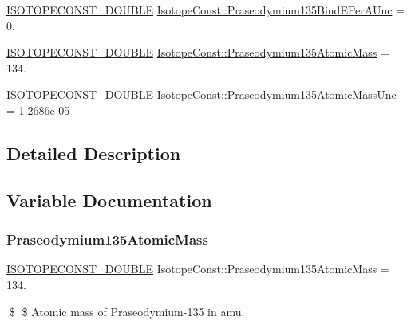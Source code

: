 \begin{DoxyCompactItemize}
\item 
\mbox{\hyperlink{group___isotope_const-_macros_ga8f45a7272ce02c0b4c65c44636ed719a}{I\+S\+O\+T\+O\+P\+E\+C\+O\+N\+S\+T\+\_\+\+D\+O\+U\+B\+LE}} \mbox{\hyperlink{group___isotope_const-_praseodymium-_pr135_gaa2e32c6ea644a5f626e7613ca90091ff}{Isotope\+Const\+::\+Praseodymium135\+Bind\+E\+Per\+A\+Unc}} = 0.
\item 
\mbox{\hyperlink{group___isotope_const-_macros_ga8f45a7272ce02c0b4c65c44636ed719a}{I\+S\+O\+T\+O\+P\+E\+C\+O\+N\+S\+T\+\_\+\+D\+O\+U\+B\+LE}} \mbox{\hyperlink{group___isotope_const-_praseodymium-_pr135_ga6e013e1e318a009cbfbd9b485cb2baae}{Isotope\+Const\+::\+Praseodymium135\+Atomic\+Mass}} = 134.
\item 
\mbox{\hyperlink{group___isotope_const-_macros_ga8f45a7272ce02c0b4c65c44636ed719a}{I\+S\+O\+T\+O\+P\+E\+C\+O\+N\+S\+T\+\_\+\+D\+O\+U\+B\+LE}} \mbox{\hyperlink{group___isotope_const-_praseodymium-_pr135_ga9760364740a16dc06a6e58fcbd4e083f}{Isotope\+Const\+::\+Praseodymium135\+Atomic\+Mass\+Unc}} = 1.\+2686e-\/05
\end{DoxyCompactItemize}


\subsection{Detailed Description}


\subsection{Variable Documentation}
\mbox{\label{group___isotope_const-_praseodymium-_pr135_ga6e013e1e318a009cbfbd9b485cb2baae}} 
\subsubsection{\texorpdfstring{Praseodymium135\+Atomic\+Mass}{Praseodymium135AtomicMass}}
{\footnotesize\ttfamily \mbox{\hyperlink{group___isotope_const-_macros_ga8f45a7272ce02c0b4c65c44636ed719a}{I\+S\+O\+T\+O\+P\+E\+C\+O\+N\+S\+T\+\_\+\+D\+O\+U\+B\+LE}} Isotope\+Const\+::\+Praseodymium135\+Atomic\+Mass = 134.}

\$ \$ Atomic mass of Praseodymium-\/135 in amu. \mbox{\label{group___isotope_const-_praseodymium-_pr135_ga9760364740a16dc06a6e58fcbd4e083f}} 
